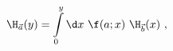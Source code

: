 \begin{equation}
\H_{\vec{a}}(y) = \int\limits_0^y \d x \ \f(a;x) \ \H_{\vec{b}}(x) \ ,
\label{eq:def}
\end{equation}

